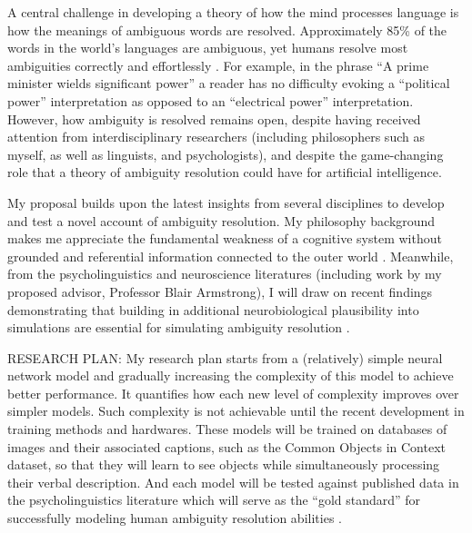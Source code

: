 \documentclass[letterpaper, 12pt]{article}
\begin{document}

A central challenge in developing a theory of how the mind processes language is how the meanings of ambiguous words are resolved. Approximately 85\% of the words in the world's languages are ambiguous, yet humans resolve most ambiguities correctly and effortlessly \citep{KleinRepresentationPolysemousWords2001}.  For example, in the phrase ``A prime minister wields significant power'' a reader has no difficulty evoking a ``political power'' interpretation as opposed to an ``electrical power'' interpretation.  However, how ambiguity is resolved remains open, despite having received attention from interdisciplinary researchers (including philosophers such as myself, as well as linguists, and psychologists), and despite the game-changing role that a theory of ambiguity resolution could have for artificial intelligence.

My proposal builds upon the latest insights from several disciplines to develop and test a novel account of ambiguity resolution. My philosophy background makes me appreciate the fundamental weakness of a cognitive system without grounded and referential information connected to the outer world \citep{searleMindsBrainsPrograms1980}. Meanwhile, from the psycholinguistics and neuroscience literatures (including work by my proposed advisor, Professor Blair Armstrong), I will draw on recent findings demonstrating that building in additional neurobiological plausibility into simulations are essential for simulating ambiguity resolution \citep{Armstrong2016Disparatesemanticambiguity}.

RESEARCH PLAN: My research plan starts from a (relatively) simple neural network model and gradually increasing the complexity of this model to achieve better performance. It quantifies how each new level of complexity improves over simpler models. Such complexity is not achievable until the recent development in training methods and hardwares. These models will be trained on databases of images and their associated captions, such as the Common Objects in Context dataset, so that they will learn to see objects while simultaneously processing their verbal description. And each model will be tested against published data in the psycholinguistics literature which will serve as the ``gold standard'' for successfully modeling human ambiguity resolution abilities \citep{Eddington2015Howmeaningsimilarity}.
\end{document}

